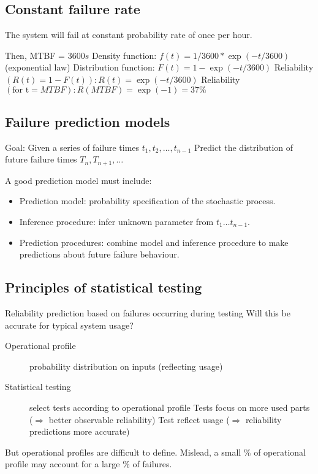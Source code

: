 \subsection{Constant failure rate}
The system will fail at constant probability rate of once per hour. \newline

Then, MTBF = $3600 s$ \newline
Density function: $f(t) = 1/3600 * \exp( -t / 3600)$ (exponential law) \newline
Distribution function: $F(t) = 1 - \exp(-t / 3600)$ \newline
Reliability $(R (t) = 1 - F(t)) : R(t) = \exp(-t / 3600)$ \newline
Reliability $(\textrm{for t} = MTBF): R(MTBF) = \exp(-1) = 37\%$ \newline

\subsection{Failure prediction models}
Goal: Given a series of failure times ${t}_{1}, {t}_{2},\ldots, {t}_{n-1}$ \newline
Predict the distribution of future failure times ${T}_{n}, {T}_{n+1},\ldots$ \newline

A good prediction model must include:

\begin{itemize}
    \item Prediction model: probability specification of the stochastic process.
    \item Inference procedure: infer unknown parameter from ${t}_{1}\ldots{t}_{n-1}$.
    \item Prediction procedures: combine model and inference procedure to make predictions about future failure behaviour.
\end{itemize}

\subsection{Principles of statistical testing}

Reliability prediction based on failures occurring during testing \newline
Will this be accurate for typical system usage?

\begin{description}
    \item[Operational profile] probability distribution on inputs (reflecting usage)
    \item[Statistical testing] select tests according to operational profile
        \subitem{} Tests focus on more used parts ($\Rightarrow$ better observable reliability)
        \subitem{} Test reflect usage ($\Rightarrow$ reliability predictions more accurate)
\end{description}

But operational profiles are difficult to define.\newline
Mislead, a small \% of operational profile may account for a large \% of failures.
